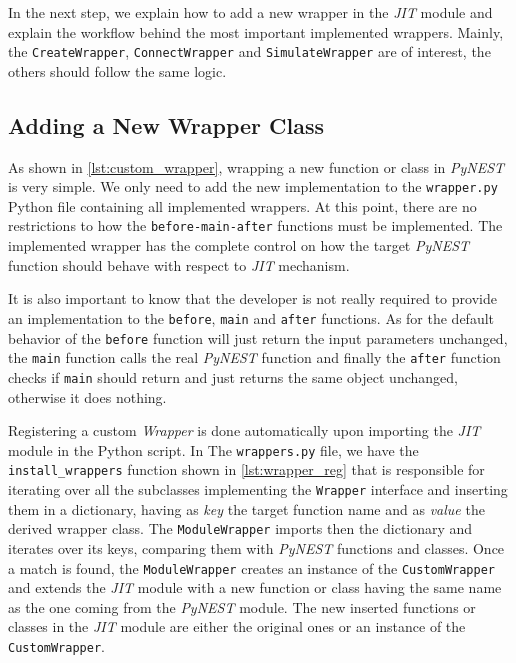    In the next step, we explain how to add a new wrapper in the \emph{JIT} module and explain the workflow behind the most important implemented wrappers. Mainly, the \texttt{CreateWrapper}, \texttt{ConnectWrapper} and \texttt{SimulateWrapper} are of interest, the others should follow the same logic.
   
   
\subsection{Adding a New Wrapper Class}

As shown in \ref{lst:custom_wrapper}, wrapping a new function or class in \emph{PyNEST} is very simple. We only need to add the new implementation to the \texttt{wrapper.py} Python file containing all implemented wrappers. At this point, there are no restrictions to how the \texttt{before-main-after} functions must be implemented. The implemented wrapper has the complete  control on how the target \emph{PyNEST} function should behave with respect to \emph{JIT} mechanism.


It is also important to know that the developer is not really required to provide an  implementation to the \texttt{before}, \texttt{main} and \texttt{after} functions. As for the default behavior of the \texttt{before} function will just return the input parameters unchanged, the \texttt{main} function calls the real \emph{PyNEST} function and finally the \texttt{after} function checks if \texttt{main} should return and just returns the same object unchanged, otherwise it does nothing.

Registering a custom \emph{Wrapper} is done automatically upon importing the \emph{JIT} module in the Python script. In The \texttt{wrappers.py} file, we have the \texttt{install\_wrappers} function shown in \autoref{lst:wrapper_reg} that is responsible for iterating over all the subclasses implementing the \texttt{Wrapper} interface and inserting them in a dictionary, having as \emph{key} the target function name and as \emph{value} the derived wrapper class. The \texttt{ModuleWrapper} imports then the dictionary and iterates over its keys, comparing them with \emph{PyNEST} functions and classes. Once a match is found, the \texttt{ModuleWrapper} creates an instance of the \texttt{CustomWrapper} and extends the \emph{JIT} module with a new function or class having the same name as the one coming from the \emph{PyNEST} module. The new inserted functions or classes in the \emph{JIT} module are either the original ones or an instance of the \texttt{CustomWrapper}.

